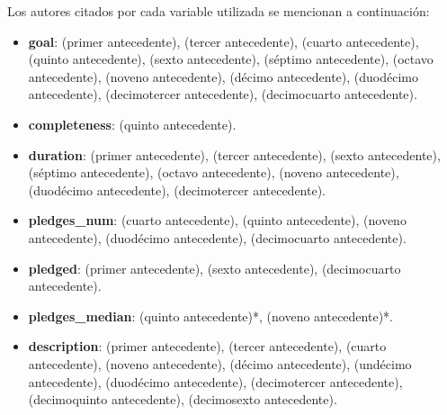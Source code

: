 Los autores citados por cada variable utilizada se mencionan a continuación:
\begin{itemize}
	\item \textbf{goal}: \citeauthor{pr_kamath2018suplearn} (primer antecedente), \citeauthor{pr_zhou2015projectdesc} (tercer antecedente), \citeauthor{pr_yuan2016textanalytics} (cuarto antecedente), \citeauthor{pr_chen2015predcrowd} (quinto antecedente), \citeauthor{pr_li2016predcrowd} (sexto antecedente), \citeauthor{pr_kaur2017socmedcrowd} (séptimo antecedente), \citeauthor{pr_yu2018deeplearning} (octavo antecedente), \citeauthor{pr_jin2019dayssuccess} (noveno antecedente), \citeauthor{pr_cheng2019deeplearning} (décimo antecedente), \citeauthor{pr_mitra2014phrases} (duodécimo antecedente), \citeauthor{pr_sawhney2016usingLT} (decimotercer antecedente), \citeauthor{pr_chen2013kickpredict} (decimocuarto antecedente).
	\item \textbf{completeness}: \citeauthor{pr_chen2015predcrowd} (quinto antecedente).
	\item \textbf{duration}: \citeauthor{pr_kamath2018suplearn} (primer antecedente), \citeauthor{pr_zhou2015projectdesc} (tercer antecedente), \citeauthor{pr_li2016predcrowd} (sexto antecedente), \citeauthor{pr_kaur2017socmedcrowd} (séptimo antecedente), \citeauthor{pr_yu2018deeplearning} (octavo antecedente), \citeauthor{pr_jin2019dayssuccess} (noveno antecedente), \citeauthor{pr_mitra2014phrases} (duodécimo antecedente), \citeauthor{pr_sawhney2016usingLT} (decimotercer antecedente).
	\item \textbf{pledges\_num}: \citeauthor{pr_yuan2016textanalytics} (cuarto antecedente), \citeauthor{pr_chen2015predcrowd} (quinto antecedente), \citeauthor{pr_jin2019dayssuccess} (noveno antecedente), \citeauthor{pr_mitra2014phrases} (duodécimo antecedente), \citeauthor{pr_chen2013kickpredict} (decimocuarto antecedente).
	\item \textbf{pledged}: \citeauthor{pr_kamath2018suplearn} (primer antecedente), \citeauthor{pr_li2016predcrowd} (sexto antecedente), \citeauthor{pr_chen2013kickpredict} (decimocuarto antecedente).
	\item \textbf{pledges\_median}: \citeauthor{pr_chen2015predcrowd} (quinto antecedente)*, \citeauthor{pr_jin2019dayssuccess} (noveno antecedente)*.
	\item \textbf{description}: \citeauthor{pr_kamath2018suplearn} (primer antecedente), \citeauthor{pr_zhou2015projectdesc} (tercer antecedente), \citeauthor{pr_yuan2016textanalytics} (cuarto antecedente), \citeauthor{pr_jin2019dayssuccess} (noveno antecedente), \citeauthor{pr_cheng2019deeplearning} (décimo antecedente), \citeauthor{pr_chen2019keywords_crowdfunding} (undécimo antecedente), \citeauthor{pr_mitra2014phrases} (duodécimo antecedente), \citeauthor{pr_sawhney2016usingLT} (decimotercer antecedente), \citeauthor{pr_chaichi2019nlp_3dprinting} (decimoquinto antecedente), \citeauthor{pr_lee2018contentDL} (decimosexto antecedente).

\end{itemize}
